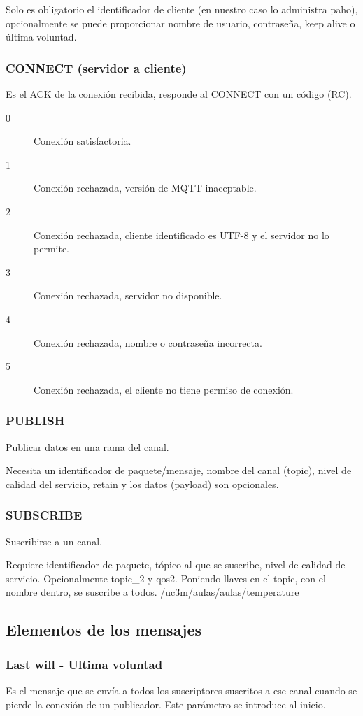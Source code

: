 \documentclass[12pt]{report} %
\begin{document}
Solo es obligatorio el identificador de cliente (en nuestro caso lo administra paho), opcionalmente se puede proporcionar nombre de usuario, contraseña, keep alive o última voluntad.

\subsubsection{CONNECT (servidor a cliente)}
Es el ACK de la conexión recibida, responde al CONNECT con un código (RC).
\begin{description}
	\item[0] Conexión satisfactoria.
	\item[1] Conexión rechazada, versión de MQTT inaceptable.	
	\item[2] Conexión rechazada, cliente identificado es UTF-8 y el servidor no lo permite.	
	\item[3] Conexión rechazada, servidor no disponible.	
	\item[4] Conexión rechazada, nombre o contraseña incorrecta.
	\item[5] Conexión rechazada, el cliente no tiene permiso de conexión.
\end{description}

\subsubsection{PUBLISH}
Publicar datos en una rama del canal. 

Necesita un identificador de paquete/mensaje, nombre del canal (topic), nivel de calidad del servicio, retain y los datos (payload) son opcionales.

\subsubsection{SUBSCRIBE}
Suscribirse a un canal.

Requiere identificador de paquete, tópico al que se suscribe, nivel de calidad de servicio. Opcionalmente topic\_2 y qos2. Poniendo llaves en el topic, con el nombre dentro, se suscribe a todos. /uc3m/aulas/{aulas}/temperature

\subsection{Elementos de los mensajes} 

\subsubsection{Last will - Ultima voluntad} 
Es el mensaje que se envía a todos los suscriptores suscritos a ese canal cuando se pierde la conexión de un publicador. Este parámetro se introduce al inicio.
\end{document}
